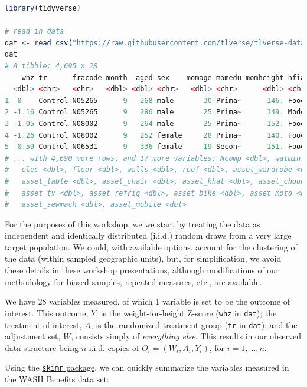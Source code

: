 \documentclass[
  12pt, krantz2,
]{book}
\newcommand{\passthrough}[1]{#1}
\theoremstyle{definition}
\theoremstyle{definition}
\theoremstyle{definition}
\newcommand{\1}{\mathbbm{1}}
\begin{document}
\begin{lstlisting}[language=R]
library(tidyverse)

# read in data
dat <- read_csv("https://raw.githubusercontent.com/tlverse/tlverse-data/master/wash-benefits/washb_data.csv")
dat
# A tibble: 4,695 x 28
    whz tr      fracode month  aged sex    momage momedu momheight hfiacat Nlt18
  <dbl> <chr>   <chr>   <dbl> <dbl> <chr>   <dbl> <chr>      <dbl> <chr>   <dbl>
1  0    Control N05265      9   268 male       30 Prima~      146. Food S~     3
2 -1.16 Control N05265      9   286 male       25 Prima~      149. Modera~     2
3 -1.05 Control N08002      9   264 male       25 Prima~      152. Food S~     1
4 -1.26 Control N08002      9   252 female     28 Prima~      140. Food S~     3
5 -0.59 Control N06531      9   336 female     19 Secon~      151. Food S~     2
# ... with 4,690 more rows, and 17 more variables: Ncomp <dbl>, watmin <dbl>,
#   elec <dbl>, floor <dbl>, walls <dbl>, roof <dbl>, asset_wardrobe <dbl>,
#   asset_table <dbl>, asset_chair <dbl>, asset_khat <dbl>, asset_chouki <dbl>,
#   asset_tv <dbl>, asset_refrig <dbl>, asset_bike <dbl>, asset_moto <dbl>,
#   asset_sewmach <dbl>, asset_mobile <dbl>
\end{lstlisting}

For the purposes of this workshop, we we start by treating the data as independent
and identically distributed (i.i.d.) random draws from a very large target
population. We could, with available options, account for the clustering of the
data (within sampled geographic units), but, for simplification, we avoid these
details in these workshop presentations, although modifications of our
methodology for biased samples, repeated measures, etc., are available.

We have 28 variables measured, of which 1 variable is set to be the outcome of
interest. This outcome, \(Y\), is the weight-for-height Z-score (\passthrough{\lstinline!whz!} in \passthrough{\lstinline!dat!});
the treatment of interest, \(A\), is the randomized treatment group (\passthrough{\lstinline!tr!} in
\passthrough{\lstinline!dat!}); and the adjustment set, \(W\), consists simply of \emph{everything else}. This
results in our observed data structure being \(n\) i.i.d. copies of \(O_i = (W_i, A_i, Y_i)\), for \(i = 1, \ldots, n\).

Using the \href{https://CRAN.R-project.org/package=skimr}{\passthrough{\lstinline!skimr!} package}, we can
quickly summarize the variables measured in the WASH Benefits data set:
\end{document}
